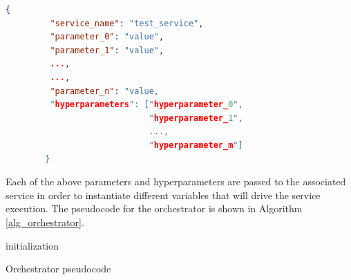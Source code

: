 \documentclass[\main/main.tex]{subfiles}
\begin{document}
\begin{center}
    \begin{lstlisting}[language=json, caption="Parameter message example", captionpos=b, label={parameter_message}]
        {
         "service_name": "test_service",
         "parameter_0": "value",
         "parameter_1": "value",
         ...,
         ...,
         "parameter_n": "value,
         "hyperparameters": ["hyperparameter_0", 
                             "hyperparameter_1", 
                             ..., 
                             "hyperparameter_m"]
        }
    \end{lstlisting}
\end{center}

Each of the above parameters and hyperparameters are passed to the associated service in order to instantiate different variables that will drive the service execution.
The pseudocode for the orchestrator is shown in Algorithm \ref{alg_orchestrator}.
\begin{center}
    \begin{algorithm}[H]
     initialization\;
    \caption{Orchestrator pseudocode}
    \label{alg_orchestrator}
    \end{algorithm}
    
\end{center}
\end{document}
